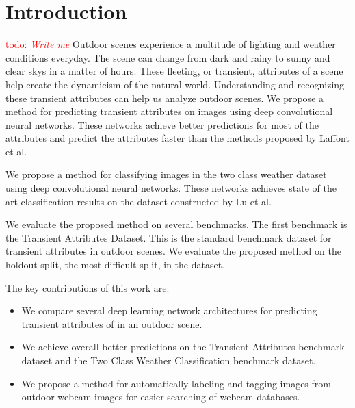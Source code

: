 \documentclass{article}
\newcommand{\todo}[1]{\textcolor{red}{todo: {\em #1}}}
\begin{document}
\section{Introduction}
\todo{Write me}\newline\indent
Outdoor scenes experience a multitude of lighting and weather conditions
everyday.  The scene can change from dark and rainy to sunny and clear 
skys in a matter of hours.  These fleeting, or transient, attributes of
a scene help create the dynamicism of the natural world.  Understanding 
and recognizing these transient attributes can help us analyze outdoor
scenes. We propose a method for predicting transient attributes on images 
using deep convolutional neural networks.  These networks achieve better 
predictions for most of the attributes and predict the attributes
faster than the methods proposed by Laffont\cite{Laffont14} et al.

We propose a method for classifying images in the two class weather 
dataset using deep convolutional neural networks.  These networks 
achieves state of the art classification results on the dataset
constructed by Lu\cite{lutwoclass} et al.

We evaluate the proposed method on several benchmarks.  The first 
benchmark is the Transient Attributes Dataset\cite{Laffont14}.  This 
is the standard benchmark dataset for transient attributes in outdoor
scenes.  We evaluate the proposed method on the holdout split, the 
most difficult split, in the dataset.  


The key contributions of this work are:
\begin{itemize}

  \item We compare several deep learning network architectures for
    		predicting transient attributes of in an outdoor scene.

	\item We achieve overall better predictions on the Transient Attributes
				benchmark dataset and the Two Class Weather Classification 
				benchmark dataset.

	\item We propose a method for automatically labeling and tagging images
				from outdoor webcam images for easier searching of webcam databases.



\end{itemize}
\end{document}
